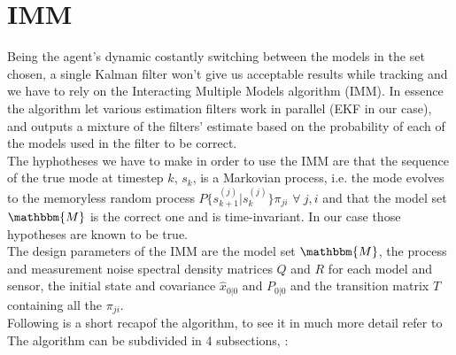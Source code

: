 \documentclass[twocolumn]{article}
\begin{document}
\section*{IMM}
Being the agent's dynamic costantly switching between the models in the set chosen, a single Kalman filter won't give us acceptable results while
tracking and we have to rely on the Interacting Multiple Models algorithm (IMM). In essence the algorithm let various estimation filters work in parallel
(EKF in our case), and outputs a mixture of the filters' estimate based on the probability of each of the models used in the filter to be correct.
\\
The hyphotheses we have to make in order to use the IMM are that the sequence of the true mode at timestep $k$, $s_{k}$, is a Markovian process, i.e. the mode evolves to the
memoryless random process $P\{s_{k+1}^{(j)}|s_{k}^{(j)}\}\pi_{ji}$ $\forall\ j,i$ and that the model set $\mathbbm{M}$ is the correct one and is time-invariant.
In our case those hypotheses are known to be true.
\\
The design parameters of the IMM are the model set $\mathbbm{M}$, the process and measurement noise spectral density
matrices $Q$ and $R$ for each model and sensor, the initial state and covariance $\hat{x}_{0|0}$ and $P_{0|0}$
and the transition matrix $T$ containing all the $\pi_{ji}$.
\\
Following is a short recapof the algorithm, to see it in much more detail refer to %
\\
The algorithm can be subdivided in 4 subsections, :
\end{document}
